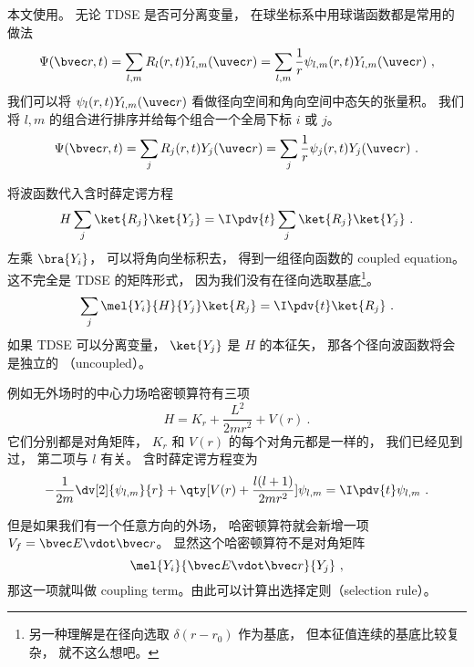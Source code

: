 
\begin{issues}
\issueAbstract
{}
\end{issues}


本文使用。 无论 TDSE 是否可分离变量， 在球坐标系中用球谐函数都是常用的做法
\begin{equation}\label{eq_RYTDSE_1}
\Psi(\bvec r, t) = \sum_{l,m} R_l (r, t) Y_{l,m} (\uvec r) = \sum_{l,m} \frac{1}{r} \psi_{l,m} (r, t) Y_{l,m} (\uvec r)~,
\end{equation}
我们可以将 $\psi_l (r, t) Y_{l,m} (\uvec r)$ 看做径向空间和角向空间中态矢的张量积。 我们将 $l, m$ 的组合进行排序并给每个组合一个全局下标 $i$ 或 $j$。
\begin{equation}
\Psi(\bvec r, t) = \sum_j R_j (r, t) Y_j (\uvec r) = \sum_j \frac{1}{r} \psi_j (r, t) Y_j (\uvec r)~.
\end{equation}

将波函数代入含时薛定谔方程
\begin{equation}
H \sum_j\ket{R_j}\ket{Y_j} = \I \pdv{t}  \sum_j\ket{R_j}\ket{Y_j}~.
\end{equation}
左乘 $\bra{Y_i}$， 可以将角向坐标积去， 得到一组径向函数的 coupled equation。 这不完全是 TDSE 的矩阵形式， 因为我们没有在径向选取基底\footnote{另一种理解是在径向选取 $\delta(r - r_0)$ 作为基底， 但本征值连续的基底比较复杂， 就不这么想吧。}。
\begin{equation}
\sum_j \mel{Y_i}{H}{Y_j} \ket{R_j} = \I \pdv{t} \ket{R_j}~.
\end{equation}
如果 TDSE 可以分离变量， $\ket{Y_j}$ 是 $H$ 的本征矢， 那各个径向波函数将会是独立的 （uncoupled）。

例如无外场时的中心力场哈密顿算符有三项
\begin{equation}\label{eq_RYTDSE_2}
H = K_r + \frac{L^2}{2mr^2} + V(r)~.
\end{equation}
它们分别都是对角矩阵， $K_r$ 和 $V(r)$ 的每个对角元都是一样的， 我们已经见到过， 第二项与 $l$ 有关。 含时薛定谔方程变为
\begin{equation}
-\frac{1}{2m} \dv[2]{\psi_{l,m}}{r} + \qty[V(r) + \frac{l(l + 1)}{2mr^2}]\psi_{l,m} = \I \pdv{t} \psi_{l,m}~.
\end{equation}

但是如果我们有一个任意方向的外场， 哈密顿算符就会新增一项 $V_f = \bvec E \vdot \bvec r$。 显然这个哈密顿算符不是对角矩阵
\begin{equation}
\mel{Y_i}{\bvec E \vdot \bvec r}{Y_j}~,
\end{equation}
那这一项就叫做 coupling term。由此可以计算出选择定则（selection rule）。
